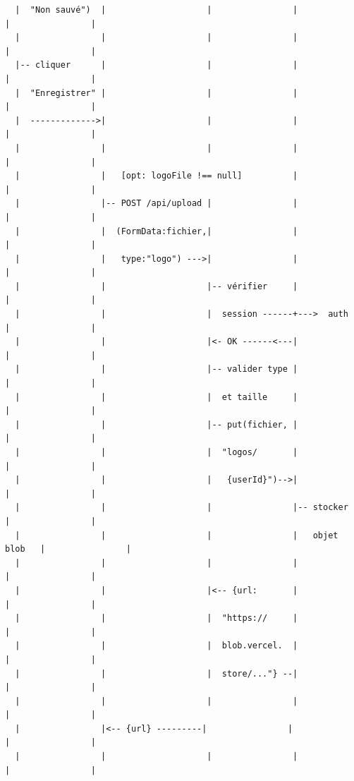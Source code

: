 \documentclass[12pt,a4paper]{article}
\begin{document}
\begin{tcolorbox}[colback=white,colframe=black!50,title=DS-02 — Mise à jour profil avec upload d'images]
\begin{verbatim}
  |  "Non sauvé")  |                    |                |                |                |
  |                |                    |                |                |                |
  |-- cliquer      |                    |                |                |                |
  |  "Enregistrer" |                    |                |                |                |
  |  ------------->|                    |                |                |                |
  |                |                    |                |                |                |
  |                |   [opt: logoFile !== null]          |                |                |
  |                |-- POST /api/upload |                |                |                |
  |                |  (FormData:fichier,|                |                |                |
  |                |   type:"logo") --->|                |                |                |
  |                |                    |-- vérifier     |                |                |
  |                |                    |  session ------+--->  auth      |                |
  |                |                    |<- OK ------<---|               |                |
  |                |                    |-- valider type |                |                |
  |                |                    |  et taille     |                |                |
  |                |                    |-- put(fichier, |                |                |
  |                |                    |  "logos/       |                |                |
  |                |                    |   {userId}")-->|                |                |
  |                |                    |                |-- stocker      |                |
  |                |                    |                |   objet blob   |                |
  |                |                    |                |                |                |
  |                |                    |<-- {url:       |                |                |
  |                |                    |  "https://     |                |                |
  |                |                    |  blob.vercel.  |                |                |
  |                |                    |  store/..."} --|                |                |
  |                |                    |                |                |                |
  |                |<-- {url} ---------|                |                |                |
  |                |                    |                |                |                |

\end{verbatim}
\end{tcolorbox}
\end{document}
